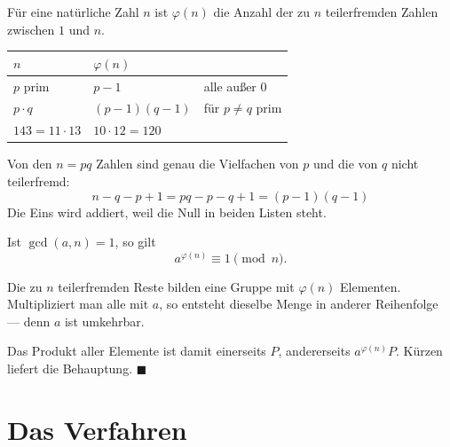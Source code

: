 \begin{merksatz}
Für eine natürliche Zahl $n$ ist $\varphi(n)$ die Anzahl der zu $n$ teilerfremden Zahlen zwischen $1$ und $n$.

\begin{center}
{\small
\renewcommand{\arraystretch}{1.5}
\begin{tabular}{@{}P{2.4cm}P{2.6cm}P{3.0cm}@{}}
\toprule
$n$ & $\varphi(n)$ & \\
\midrule
$p$ prim & $p-1$ & alle außer $0$\\
$p\cdot q$ & $(p-1)(q-1)$ & für $p \ne q$ prim\\
$143 = 11\cdot13$ & $10\cdot12 = 120$ & \\
\bottomrule
\end{tabular}}
\end{center}

Von den $n = pq$ Zahlen sind genau die Vielfachen von $p$ und die von $q$ nicht teilerfremd:
\[ n - q - p + 1 = pq-p-q+1 = (p-1)(q-1) \]
Die Eins wird addiert, weil die Null in beiden Listen steht. \checkmark
\end{merksatz}

\begin{merksatz}
Ist $\gcd(a,n) = 1$, so gilt
\[ a^{\varphi(n)} \equiv 1 \pmod n . \]

Die zu $n$ teilerfremden Reste bilden eine Gruppe mit $\varphi(n)$ Elementen. Multipliziert man alle mit $a$, so entsteht dieselbe Menge in anderer Reihenfolge --- denn $a$ ist umkehrbar.

Das Produkt aller Elemente ist damit einerseits $P$, andererseits $a^{\varphi(n)}P$. Kürzen liefert die Behauptung. $\blacksquare$

\begin{center}
\begin{minipage}{0.88\textwidth}
\end{minipage}
\end{center}
\end{merksatz}

\section{Das Verfahren}

